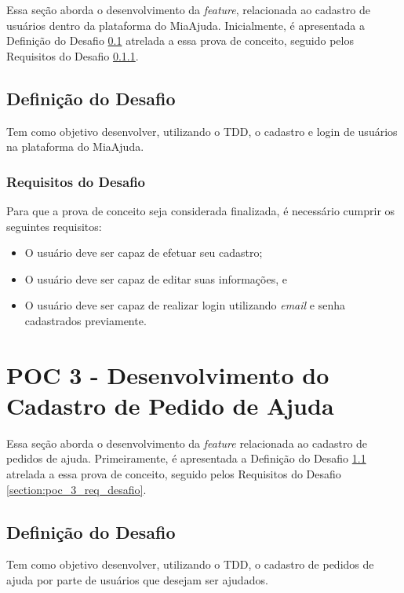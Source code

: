 Essa seção aborda o desenvolvimento da \textit{feature}, relacionada ao cadastro de usuários dentro da 
plataforma do MiaAjuda. Inicialmente, é apresentada a Definição do Desafio \ref{section:poc_2_def_desafio} 
atrelada a essa prova de conceito, seguido pelos Requisitos do Desafio \ref{section:poc_2_req_desafio}.

\subsection{Definição do Desafio}
\label{section:poc_2_def_desafio}

Tem como objetivo desenvolver, utilizando o TDD, o cadastro e login de usuários na 
plataforma do MiaAjuda.

\subsubsection{Requisitos do Desafio}
\label{section:poc_2_req_desafio}

Para que a prova de conceito seja considerada finalizada, é necessário cumprir os seguintes requisitos:

\begin{itemize}
  \item O usuário deve ser capaz de efetuar seu cadastro;
  \item O usuário deve ser capaz de editar suas informações, e
  \item O usuário deve ser capaz de realizar login utilizando \textit{email} e senha cadastrados previamente.
\end{itemize}

\section{POC 3 - Desenvolvimento do Cadastro de Pedido de Ajuda}
\label{section:poc_3}

Essa seção aborda o desenvolvimento da \textit{feature} relacionada ao cadastro de pedidos de ajuda. 
Primeiramente, é apresentada a Definição do Desafio \ref{section:poc_3_def_desafio} atrelada a essa 
prova de conceito, seguido pelos Requisitos do Desafio \ref{section:poc_3_req_desafio}.

\subsection{Definição do Desafio}
\label{section:poc_3_def_desafio}

Tem como objetivo desenvolver, utilizando o TDD, o cadastro de pedidos de ajuda por 
parte de usuários que desejam ser ajudados.

